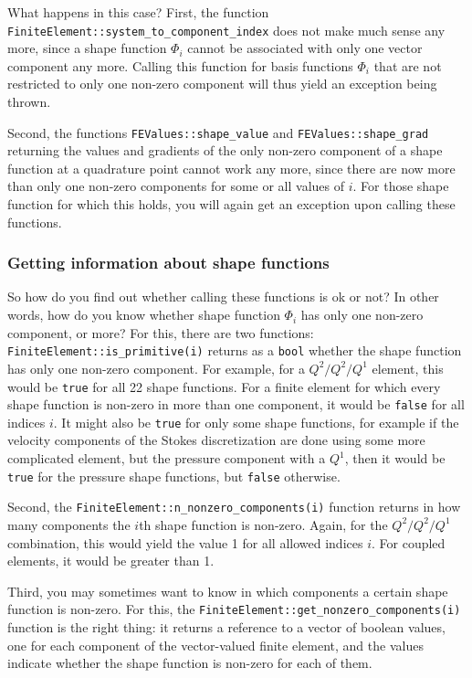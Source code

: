 \documentclass{article}
\begin{document}
What happens in this case? First, the function
\texttt{FiniteElement::system\_\-to\_\-component\_\-index} does not make much sense
any more, since a shape function $\Phi_i$ cannot be associated with only one
vector component any more. Calling this function for basis functions $\Phi_i$
that are not restricted to only one non-zero component will thus yield an
exception being thrown.

Second, the functions \texttt{FEValues::shape\_value} and
\texttt{FEValues::shape\_grad} returning the values and gradients of the only
non-zero component of a shape function at a quadrature point cannot work any
more, since there are now more than only one non-zero components for some or
all values of $i$. For those shape function for which this holds, you will
again get an exception upon calling these functions.


\subsubsection*{Getting information about shape functions}

So how do you find out whether calling these functions is ok or not? In other
words, how do you know whether shape function $\Phi_i$ has only one non-zero
component, or more? For this, there are two functions:
\texttt{FiniteElement::is\_primitive(i)} returns as a \texttt{bool} whether
the shape function has only one non-zero component. For example, for a
$Q^2/Q^2/Q^1$ element, this would be \texttt{true} for all 22 shape functions.
For a finite element for which every shape function is non-zero in more than
one component, it would be \texttt{false} for all indices $i$. It might also
be \texttt{true} for only some shape functions, for example if the velocity
components of the Stokes discretization are done using some more complicated
element, but the pressure component with a $Q^1$, then it would be
\texttt{true} for the pressure shape functions, but \texttt{false} otherwise.

Second, the \texttt{FiniteElement::n\_nonzero\_components(i)} function returns
in how many components the $i$th shape function is non-zero. Again, for the
$Q^2/Q^2/Q^1$ combination, this would yield the value 1 for all allowed
indices $i$. For coupled elements, it would be greater than 1.

Third, you may sometimes want to know in which components a certain shape
function is non-zero. For this, the
\texttt{FiniteElement::get\_nonzero\_components(i)} function is the right thing: it
returns a reference to a vector of boolean values, one for each component of
the vector-valued finite element, and the values indicate whether the shape
function is non-zero for each of them.
\end{document}
